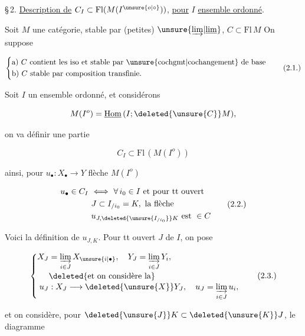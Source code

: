 
\S\,2. \uline{Description de} $C_I\subset\mathrm{Fl}(M(I^{\unsure{o|\circ}}))$, \uline{pour} $I$ \uline{ensemble ordonné}.

Soit $M$ une catégorie, stable par (petites) $\unsure{\underrightarrow{\lim}|\underline{\lim}}$, $C\subset\mathrm{Fl}\,M$  On suppose

\[
\left\{\begin{aligned}
 &\text{a) } C\text{ contient les iso et stable par \unsure{cochgmt|cochangement} de base}\\
 &\text{b) } C\text{ stable par composition transfinie.}
\end{aligned}\right. \tag*{(2.1.)}
\]

Soit $I$ un  ensemble ordonné, et considérons

\[
 M(I^o)=\underline{\mathrm{Hom}}\,(I;\deleted{\unsure{C}}M),
\]

on va définir une partie

\[
 C_I\subset\mathrm{Fl}\,(M(I^o))
\]

ainsi, pour $u_\bullet:X_\bullet\longrightarrow Y$ flèche  $M(I^o)$

\[
\begin{aligned}
 u_\bullet\in C_I\ &\Longleftrightarrow\ \forall\,i_0\in I\ \text{et pour tt ouvert}\\
 &J\subset I_{/i_0}=K,\ \text{la flèche}\\
 &u_{J,\deleted{\unsure{I_{/i_0}}}K}\ \text{est}\ \in C
\end{aligned}\tag*{(2.2.)}
\]

Voici la définition de $u_{J,K}$. Pour tt ouvert $J$ de $I$, on pose

\[
\left\{\begin{aligned}
 X_J&=\underset{i\in J}{\underrightarrow{\lim}}\,X_{\unsure{i|\bullet}},\quad
 Y_J=\underset{i\in J}{\underrightarrow{\lim}}\,Y_i,\\[-2pt]
 &\deleted{\text{et on considère la}}\\[-2pt]
 u_J&:X_J\longrightarrow \deleted{\unsure{X}}Y_J,\quad
 u_J=\underset{i\in J}{\underrightarrow{\lim}}\,u_i,
\end{aligned}\right.\tag*{(2.3.)}
\]

et on considère, pour $\deleted{\unsure{J}}K\subset\deleted{\unsure{K}}J$, le diagramme



